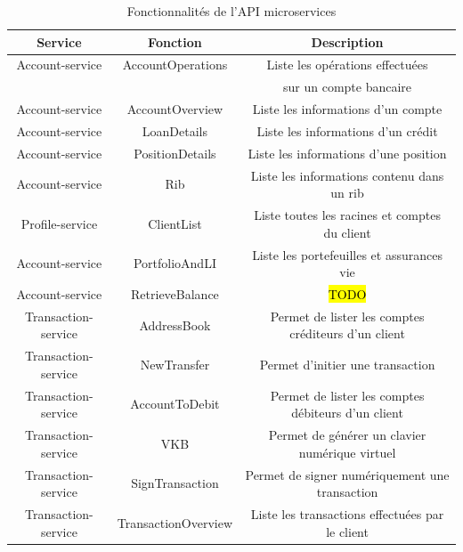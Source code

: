 
\begin{table}[h!]
	\center
	\begin{tabular}{| c | c | c |}
     \hline
     Service & Fonction & Description \\ \hline
     Account-service & AccountOperations & Liste les opérations effectuées \\ & & sur un compte bancaire \\ \hline
     Account-service & AccountOverview & Liste les informations d'un compte \\ \hline
     Account-service & LoanDetails & Liste les informations d'un crédit \\ \hline
     Account-service & PositionDetails & Liste les informations d'une position \\ \hline
     Account-service & Rib & Liste les informations contenu dans un rib \\ \hline
     Profile-service & ClientList & Liste toutes les racines et comptes du client \\ \hline
     Account-service & PortfolioAndLI & Liste les portefeuilles et assurances vie \\ \hline
     Account-service & RetrieveBalance & \hl{TODO} \\ \hline
     Transaction-service & AddressBook & Permet de lister les comptes créditeurs d'un client \\ \hline
     Transaction-service & NewTransfer & Permet d'initier une transaction \\ \hline
     Transaction-service & AccountToDebit & Permet de lister les comptes débiteurs d'un client \\ \hline
     Transaction-service & VKB & Permet de générer un clavier numérique virtuel \\ \hline
     Transaction-service & SignTransaction & Permet de signer numériquement une transaction \\ \hline
     Transaction-service & TransactionOverview & Liste les transactions effectuées par le client\\
     \hline
	\end{tabular}
	\caption{Fonctionnalités de l'API microservices}
	\label{fonctionnalites}
\end{table}
